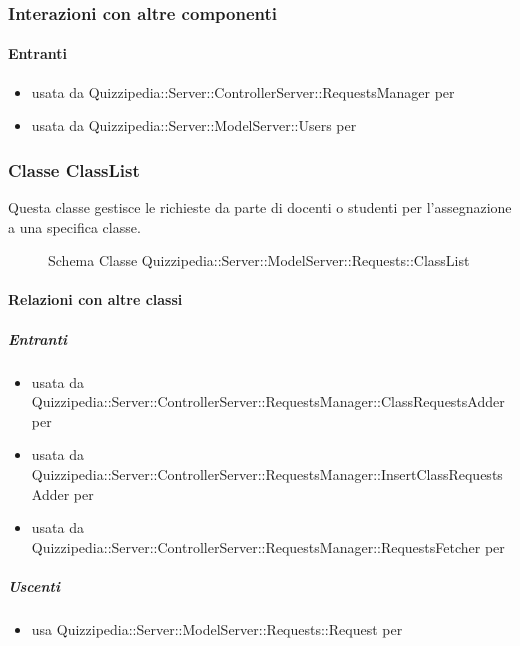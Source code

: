 \subsubsection{Interazioni con altre componenti}
\paragraph{Entranti}
\begin{itemize}
\item usata da Quizzipedia::Server::ControllerServer::RequestsManager per 
\item usata da Quizzipedia::Server::ModelServer::Users per 
\end{itemize}
\subsubsection{Classe ClassList}
Questa classe gestisce le richieste da parte di docenti o studenti per l'assegnazione a una specifica classe.
\begin{figure}[H]
\centering
\noindent{}
\caption[Schema Classe ClassList]{Schema Classe Quizzipedia::Server::ModelServer::Requests::ClassList}
\end{figure}
\paragraph{Relazioni con altre classi}
\subparagraph{Entranti}
\begin{itemize}
\item usata da Quizzipedia::Server::ControllerServer::RequestsManager::ClassRequestsAdder per 
\item usata da Quizzipedia::Server::ControllerServer::RequestsManager::InsertClassRequestsAdder per 
\item usata da Quizzipedia::Server::ControllerServer::RequestsManager::RequestsFetcher per 
\end{itemize}
\subparagraph{Uscenti}
\begin{itemize}
\item usa Quizzipedia::Server::ModelServer::Requests::Request per 
\end{itemize}
